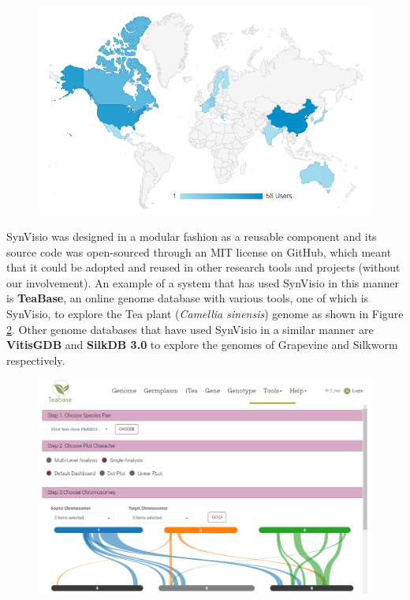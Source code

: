 \begin{figure}
  \centering
  \includegraphics[width=1\linewidth]{images/ch_6_users.PNG}
  \label{fig:ch_6_users}
\end{figure}


SynVisio was designed in a modular fashion as a reusable component and its source code was open-sourced through an MIT license on GitHub\cite{synvisio}, which meant that it could be adopted and reused in other research tools and projects (without our involvement). An example of a system that has used SynVisio in this manner is \textbf{TeaBase}, an online genome database with various tools, one of which is SynVisio, to explore the Tea plant (\textit{Camellia sinensis}) genome as shown in Figure \ref{fig:ch_6_other}\cite{teabase}. Other genome databases that have used SynVisio in a similar manner are \textbf{VitisGDB} and  \textbf{SilkDB 3.0} to explore the genomes of Grapevine and Silkworm respectively\cite{lu2020silkdb,vitisgdb}.

\begin{figure}[h]
  \centering
  \includegraphics[width=1\linewidth]{images/ch_6_other.PNG}
  \label{fig:ch_6_other}
\end{figure}


